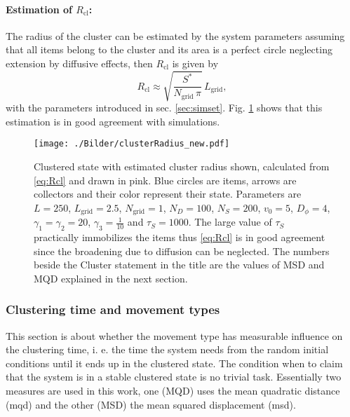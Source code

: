 
\paragraph{Estimation of $R_\text{cl}$:}

The radius of the cluster can be estimated by the system parameters assuming that all items belong to the cluster and its area is a perfect circle neglecting extension by diffusive effects, then $R_\text{cl}$ is given by
%
\begin{equation}
 R_\text{cl}\approx\sqrt{\frac{S^*}{N_\text{grid}\,\pi}}\,L_\text{grid},
 \label{eq:Rcl}
\end{equation}
%
with the parameters introduced in sec. \ref{sec:simset}. Fig. \ref{fig:Rcl} shows that this estimation is in good agreement with simulations.
%
\begin{figure}[H]
\centering
  \texttt{[image: ./Bilder/clusterRadius\_new.pdf]}
\caption{Clustered state with estimated cluster radius shown, calculated from \eqref{eq:Rcl} and drawn in pink. Blue circles are items, arrows are collectors and their color represent their state. Parameters are $L=250$, $L_\text{grid}=2.5$, $N_\text{grid}=1$, $N_D=100$, $N_S=200$, $v_0=5$, $D_\phi=4$, $\gamma_1=\gamma_2=20$, $\gamma_3=\frac{1}{10}$ and $\tau_S=1000$. The large value of $\tau_S$ practically immobilizes the items thus \eqref{eq:Rcl} is in good agreement since the broadening due to diffusion can be neglected. The numbers beside the Cluster statement in the title are the values of MSD and MQD explained in the next section.}
\label{fig:Rcl}
\end{figure}

\subsubsection{Clustering time and movement types}

This section is about whether the movement type has measurable influence on the clustering time, i. e. the time the system needs from the random initial conditions until it ends up in the clustered state.
The condition when to claim that the system is in a stable clustered state is no trivial task. Essentially two measures are used in this work, one (MQD) uses the mean quadratic distance (mqd) and the other (MSD) the mean squared displacement (msd).

